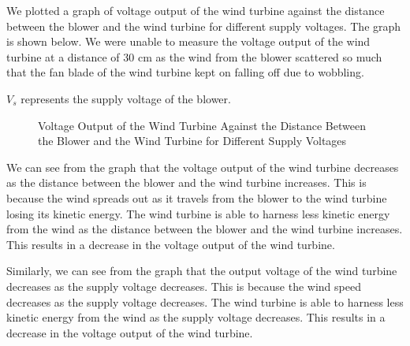 \documentclass[a4paper, 12pt, english]{article}
\begin{document}
We plotted a graph of voltage output of the wind turbine against the distance
between the blower and the wind turbine for different supply voltages. The
graph is shown below. We were unable to measure the voltage output of the wind
turbine at a distance of 30 cm as the wind from the blower scattered so much
that the fan blade of the wind turbine kept on falling off due to wobbling.

$V_s$ represents the supply voltage of the blower.
\begin{figure}[H]
	\centering
	\caption{Voltage Output of the Wind Turbine Against the Distance Between the Blower and the Wind Turbine for Different Supply Voltages}
\end{figure}

We can see from the graph that the voltage output of the wind turbine decreases
as the distance between the blower and the wind turbine increases. This is
because the wind spreads out as it travels from the blower to the wind turbine
losing its kinetic energy. The wind turbine is able to harness less kinetic
energy from the wind as the distance between the blower and the wind turbine
increases. This results in a decrease in the voltage output of the wind
turbine.

Similarly, we can see from the graph that the output voltage of the wind
turbine decreases as the supply voltage decreases. This is because the wind
speed decreases as the supply voltage decreases. The wind turbine is able to
harness less kinetic energy from the wind as the supply voltage decreases. This
results in a decrease in the voltage output of the wind turbine.
\end{document}
